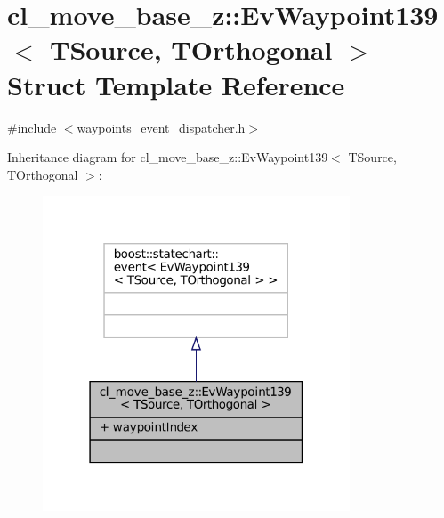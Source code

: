 \hypertarget{structcl__move__base__z_1_1EvWaypoint139}{}\section{cl\+\_\+move\+\_\+base\+\_\+z\+:\+:Ev\+Waypoint139$<$ T\+Source, T\+Orthogonal $>$ Struct Template Reference}
\label{structcl__move__base__z_1_1EvWaypoint139}


{\ttfamily \#include $<$waypoints\+\_\+event\+\_\+dispatcher.\+h$>$}



Inheritance diagram for cl\+\_\+move\+\_\+base\+\_\+z\+:\+:Ev\+Waypoint139$<$ T\+Source, T\+Orthogonal $>$\+:
\nopagebreak
\begin{figure}[H]
\begin{center}
\leavevmode
\includegraphics[width=259pt]{structcl__move__base__z_1_1EvWaypoint139__inherit__graph}
\end{center}
\end{figure}


